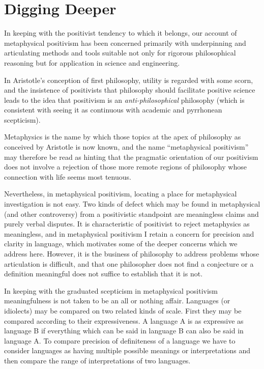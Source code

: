 
\chapter{Digging Deeper}\label{DiggingDeeper}

In keeping with the positivist tendency to which it belongs, our
account of metaphysical positivism has been concerned primarily with
underpinning and articulating methods and tools suitable not only for
rigorous philosophical reasoning but for application in science and
engineering.

In Aristotle's conception of first philosophy, utility is regarded with
some scorn, and the insistence of positivists that philosophy should
facilitate positive science leads to the idea that positivism is an
\emph{anti-philosophical} philosophy (which is consistent with seeing
it as continuous with academic and pyrrhonean scepticism).

Metaphysics is the name by which those topics at the apex of
philosophy as conceived by Aristotle is now known, and the name
``metaphysical positivism'' may therefore be read as hinting that the
pragmatic orientation of our positivism does not involve a rejection
of those more remote regions of philosophy whose connection with life
seems most tenuous.

Nevertheless, in metaphysical positivism, locating a place for
metaphysical investigation is not easy.
Two kinds of defect which may be found in metaphysical (and other
controversy) from a positivistic standpoint are meaningless claims and
purely verbal disputes.
It is characteristic of positivist to reject metaphysics as
meaningless, and in metaphysical positivism I retain a concern for
precision and clarity in language, which motivates some of the deeper
concerns which we address here.
However, it is the business of philosophy to address problems whose
articulation is difficult, and that one philosopher does not find a
conjecture or a definition meaningful does not suffice to establish
that it is not.

In keeping with the graduated scepticism in metaphysical positivism
meaningfulness is not taken to be an all or nothing affair.
Languages (or idiolects) may be compared on two related kinds of scale.
First they may be compared according to their expressiveness.
A language A is as expressive as language B if everything which can be
said in language B can also be said in language A.
To compare precision of definiteness of a language we have to consider
languages as having multiple possible meanings or interpretations and
then compare the range of interpretations of two languages.

